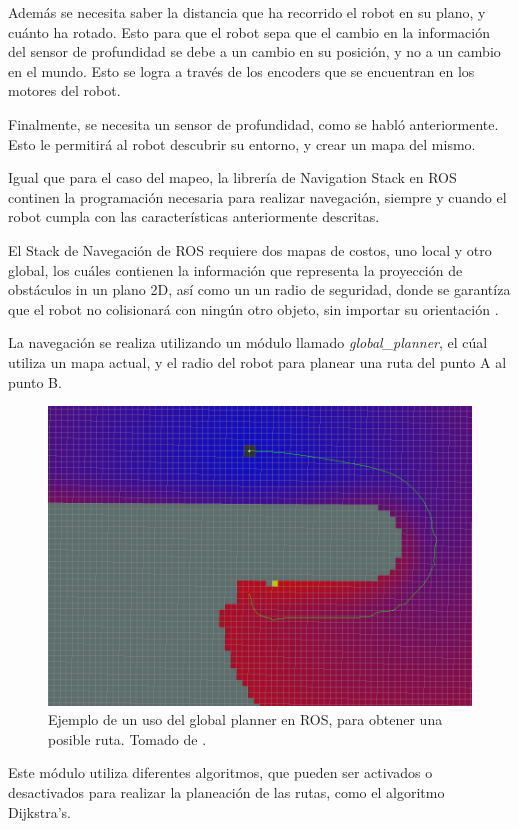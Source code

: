 Además se necesita saber la distancia que ha recorrido el robot en su plano, y cuánto ha rotado. Esto para que el robot sepa que el cambio en la información del sensor de profundidad se debe a un cambio en su posición, y no a un cambio en el mundo. Esto se logra a través de los encoders que se encuentran en los motores del robot.

Finalmente, se necesita un sensor de profundidad, como se habló anteriormente. Esto le permitirá al robot descubrir su entorno, y crear un mapa del mismo.

Igual que para el caso del mapeo, la librería de Navigation Stack en ROS continen la programación necesaria para realizar navegación, siempre y cuando el robot cumpla con las características anteriormente descritas.

El Stack de Navegación de ROS requiere dos mapas de costos, uno local y otro global, los cuáles contienen la información que representa la proyección de obstáculos in un plano 2D, así como un un radio de seguridad, donde se garantíza que el robot no colisionará con ningún otro objeto, sin importar su orientación \cite{Longhi}.

La navegación se realiza utilizando un módulo llamado \textit{global\_planner}, el cúal utiliza un mapa actual, y el radio del robot para planear una ruta del punto A al punto B.

\begin{figure}[H]
\centering
\includegraphics[scale=0.5]{imagenes/globalplanner.png}
\caption{Ejemplo de un uso del global planner en ROS, para obtener una posible ruta. Tomado de \cite{ROSPLANNER}.}
\end{figure}

Este módulo utiliza diferentes algoritmos, que pueden ser activados o desactivados para realizar la planeación de las rutas, como el algoritmo Dijkstra's.
